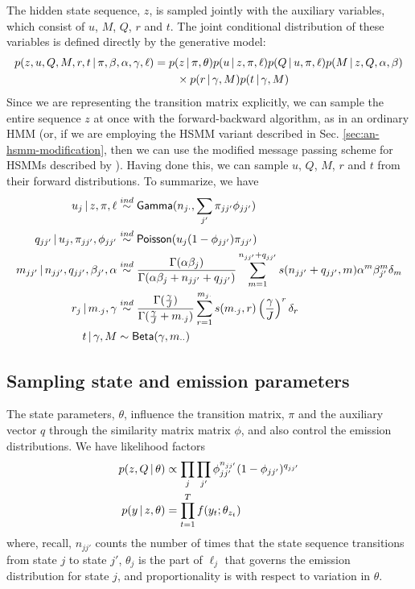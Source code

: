 The hidden state sequence, $z$, is sampled jointly with the auxiliary
variables, which consist of $u$, $M$, $Q$, $r$ and $t$.  The
joint conditional distribution of these variables is defined directly
by the generative model:
\begin{align}
  \label{eq:19}
  p(z, u, Q, M, r, t \, \vert \, \pi, \beta, \alpha, \gamma,
  \ell) &= p(z \, \vert \, \pi, \theta) p(u \, \vert \, z, \pi, \ell) p(Q \, \vert \,
  u, \pi, \ell) p(M \, \vert \,
  z, Q, \alpha, \beta) \\
  &\qquad \times p(r \, \vert \,
  \gamma, M) p(t \, \vert \, \gamma, M)
\end{align}
Since we are representing the transition matrix explicitly, we can
sample the entire sequence $z$ at once with the forward-backward algorithm,
as in an ordinary HMM (or, if we are employing the HSMM variant
described in Sec. \ref{sec:an-hsmm-modification}, then we can use the
modified message passing scheme for HSMMs described by
\citet{johnson2013bayesian}).  
Having done this, we can sample $u$, $Q$, $M$,
$r$ and $t$ from their forward distributions.  To summarize,
we have
\begin{align}
  \label{eq:48}
  u_j \, \vert \, z, \pi, \ell &\stackrel{ind}{\sim}
  \mathsf{Gamma}(n_{j\cdot},\sum_{j'} \pi_{jj'}\phi_{jj'}) \\
  q_{jj'} \, \vert \, u_j, \pi_{jj'}, \phi_{jj'} &\stackrel{ind}{\sim}
  \mathsf{Poisson}(u_j(1 - \phi_{jj'})\pi_{jj'}) \\
  m_{jj'} \, \vert \, n_{jj'}, q_{jj'}, \beta_{j'}, \alpha &\stackrel{ind}{\sim}
  \frac{\Gamma(\alpha\beta_j)}{\Gamma(\alpha\beta_j + n_{jj'} +
    q_{jj'})}\sum_{m=1}^{n_{jj'} + q_{jj'}} s(n_{jj'} + q_{jj'}, m) \alpha^m \beta_{j'}^m \delta_{m}
  \\
  r_j \, \vert \, m_{\cdot j}, \gamma &\stackrel{ind}{\sim}
  \frac{\Gamma(\frac{\gamma}{J})}{\Gamma(\frac{\gamma}{J} + m_{\cdot
      j})} \sum_{r=1}^{m_{j\cdot}} s(m_{\cdot j}, r)
  \left(\frac{\gamma}{J}\right)^r \delta_r \\
  t \, \vert \, \gamma, M &\sim \mathsf{Beta}(\gamma,m_{\cdot\cdot})
\end{align}

\subsection{Sampling state and emission parameters}
\label{sec:sampling-eta}

The state parameters, $\theta$, influence the transition matrix,
$\pi$ and the auxiliary vector $q$ through the similarity matrix
matrix $\phi$, and also control the emission distributions.
We have likelihood factors
\begin{align}
  \label{eq:65}
  p(z, Q \, \vert \, \theta) &\propto \prod_{j}\prod_{j'}
  \phi_{jj'}^{n_{jj'}}(1-\phi_{jj'})^{q_{jj'}} \\
  p(y \, \vert \, z, \theta) &= \prod_{t=1}^T f(y_t; \theta_{z_t})
\end{align}
where, recall, $n_{jj'}$ counts the number of times that the state
sequence transitions from state $j$ to state $j'$, $\theta_j$ is the
part of $\ell_j$ that governs the emission distribution for state $j$,
and proportionality is with respect to variation in $\theta$.

